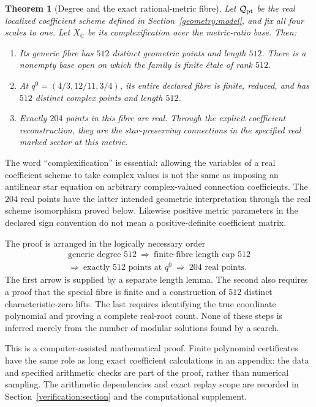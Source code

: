 \documentclass[11pt,a4paper]{article}
\newtheorem{theorem}{Theorem}[section]
\theoremstyle{remark}\newtheorem{remark}[theorem]{Remark}
\begin{document}
\begin{theorem}[Degree and the exact rational-metric fibre]
\label{main:count}
Let $\mathcal Q_{\rm pt}$ be the real localized coefficient scheme defined
in Section~\ref{geometry:model}, and fix all four scales to one.
Let $X_{\mathbb C}$ be its complexification over the metric-ratio base.
Then:
\begin{enumerate}[label=\textup{(\roman*)}]
\item Its generic fibre has $512$ distinct geometric points and length
$512$. There is a nonempty base open on which the family is finite
\'etale of rank $512$.
\item At $q^0=(4/3,12/11,3/4)$, its entire declared fibre is finite,
reduced, and has $512$ distinct complex points and length $512$.
\item Exactly $204$ points in this fibre are real. Through the explicit
coefficient reconstruction, they are the star-preserving connections
in the specified real marked sector at this metric.
\end{enumerate}
\end{theorem}

The word ``complexification'' is essential: allowing the variables of
a real coefficient scheme to take complex values is not the same as
imposing an antilinear star equation on arbitrary complex-valued
connection coefficients. The $204$ real points have the latter intended
geometric interpretation through the real scheme isomorphism proved
below. Likewise positive metric parameters in the declared sign
convention do not mean a positive-definite coefficient matrix.

The proof is arranged in the logically necessary order
\[
 \begin{gathered}
 \text{generic degree }512
 \ \Longrightarrow\ \text{finite-fibre length cap }512\\
 \Longrightarrow\ \text{exactly }512\text{ points at }q^0
 \ \Longrightarrow\ 204\text{ real points}.
 \end{gathered}
\]
The first arrow is supplied by a separate length lemma. The second
also requires a proof that the special fibre is finite and a construction
of $512$ distinct characteristic-zero lifts. The last requires identifying
the true coordinate polynomial and proving a complete real-root count.
None of these steps is inferred merely from the number of modular
solutions found by a search.

This is a computer-assisted mathematical proof. Finite polynomial
certificates have the same role as long exact coefficient calculations
in an appendix: the data and specified arithmetic checks are part of
the proof, rather than numerical sampling. The arithmetic dependencies and exact replay scope are recorded in
Section~\ref{verification:section} and the computational supplement.
\end{document}
